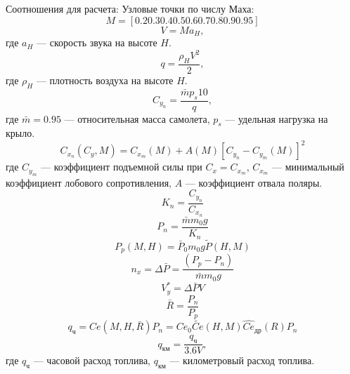Соотношения для расчета:
Узловые точки по числу Маха:
\[
    M = [0.2 0.3 0.4 0.5 0.6 0.7 0.8 0.9 0.95]
\]
\begin{equation}
    V = M a_H,
    \label{eq:V_speed}
\end{equation}
где $a_H$ --- скорость звука на высоте $H$.
\begin{equation}
    q = \frac{\rho_H V^2}{2},
    \label{eq:q_value}
\end{equation}
где $\rho_H$ --- плотность воздуха на высоте $H$.
\begin{equation}
    C_{y_n} = \frac{\bar{m} p_s 10}{q},
    \label{eq:c_y_n}
\end{equation}
где $\bar{m} = 0.95$ --- относительная масса самолета, $p_s$ --- удельная 
нагрузка на крыло.
\begin{equation}
    C_{x_n}(C_y, M) = C_{x_m}(M) + A(M) \left[ C_{y_n} - C_{y_m}(M)\right]^2
    \label{eq:c_x_n}
\end{equation}
где $C_{y_m}$ --- коэффициент подъемной силы при $C_x = C_{x_m}$, $C_{x_m}$ ---
минимальный коэффициент лобового сопротивления, $A$ --- коэффициент отвала
поляры.
\begin{equation}
    K_n = \frac{C_{y_n}}{C_{x_n}}
    \label{eq:K_n}
\end{equation}
\begin{equation}
    P_n = \frac{\bar{m} m_0 g}{K_n}
    \label{eq:P_potr}
\end{equation}
\begin{equation}
    P_p(M,H) = \bar{P}_0 m_0 g \tilde{P}(H,M)
    \label{eq:P_rasp}
\end{equation}
\begin{equation}
    n_x = \Delta \bar{P} = \frac{(P_p - P_n)}{\bar{m} m_0 g}
    \label{eq:n_x}
\end{equation}
\begin{equation}
    V_y^* = \Delta \bar{P} V
    \label{eq:Vy}
\end{equation}
\begin{equation}
    \bar{R} = \frac{P_n}{P_p}
    \label{eq:R_dross}
\end{equation}
\begin{equation}
    q_{ч} = Ce(M,H,\bar{R})P_n = Ce_0 \tilde{Ce}(H,M) \hat{Ce}_{др}(R) P_n
    \label{eq:q_chas}
\end{equation}
\begin{equation}
    q_{км} = \frac{q_{ч}}{3.6V},
    \label{eq:q_km}
\end{equation}
где $q_{ч}$ --- часовой расход топлива, $q_{км}$ --- километровый расход топлива.

